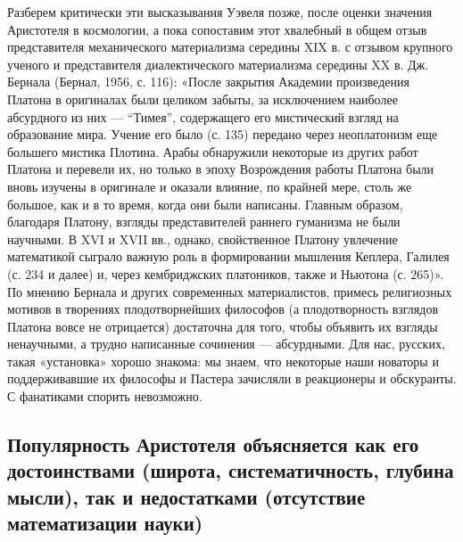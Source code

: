 Разберем  критически  эти  высказывания  Уэвеля  позже,  после  оценки
значения Аристотеля в  космологии, а пока сопоставим  этот хвалебный в
общем отзыв представителя механического материализма середины XIX в. с
отзывом крупного ученого  и представителя диалектического материализма
середины XX  в. Дж.  Бернала (Бернал, 1956,  с. 116):  «После закрытия
Академии  произведения Платона  в оригиналах  были целиком  забыты, за
исключением наиболее абсурдного из  них --- ``Тимея'', содержащего его
мистический  взгляд на  образование  мира. Учение  его  было (с.  135)
передано  через  неоплатонизм  еще  большего  мистика  Плотина.  Арабы
обнаружили некоторые из других работ  Платона и перевели их, но только
в эпоху  Возрождения работы Платона  были вновь изучены в  оригинале и
оказали влияние, по крайней мере, столь  же большое, как и в то время,
когда они  были написаны. Главным образом,  благодаря Платону, взгляды
представителей раннего гуманизма  не были научными. В XVI  и XVII вв.,
однако, свойственное Платону увлечение математикой сыграло важную роль
в формировании  мышления Кеплера,  Галилея (с. 234  и далее)  и, через
кембриджских платоников, также и Ньютона  (с. 265)». По мнению Бернала
и  других современных  материалистов,  примесь  религиозных мотивов  в
творениях плодотворнейших философов (а плодотворность взглядов Платона
вовсе не  отрицается) достаточна для  того, чтобы объявить  их взгляды
ненаучными,  а трудно  написанные сочинения  --- абсурдными.  Для нас,
русских,  такая «установка»  хорошо знакома:  мы знаем,  что некоторые
наши  новаторы и  поддерживавшие  их философы  и  Пастера зачисляли  в
реакционеры и обскуранты. С фанатиками спорить невозможно.

\subsection{Популярность Аристотеля объясняется  как его достоинствами
(широта,   систематичность,  глубина   мысли),   так  и   недостатками
(отсутствие математизации науки)}

